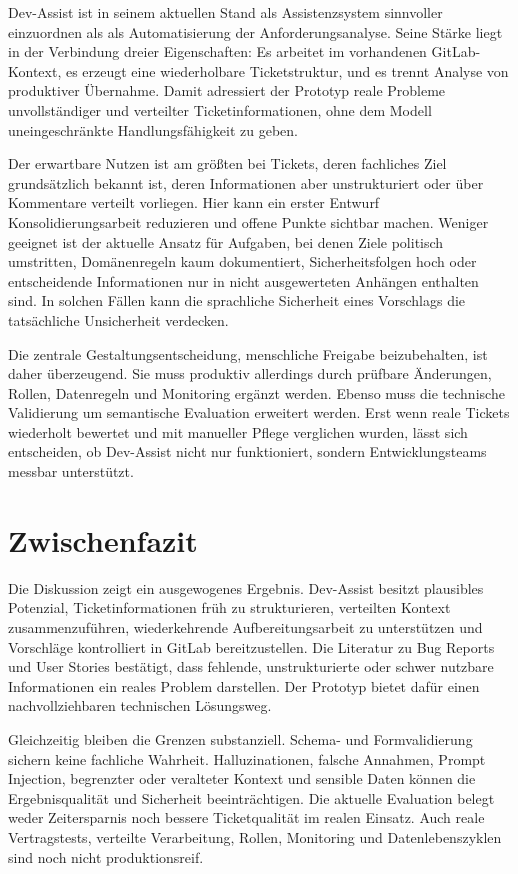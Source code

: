 Dev-Assist ist in seinem aktuellen Stand als Assistenzsystem sinnvoller einzuordnen als als Automatisierung der Anforderungsanalyse. Seine Stärke liegt in der Verbindung dreier Eigenschaften: Es arbeitet im vorhandenen GitLab-Kontext, es erzeugt eine wiederholbare Ticketstruktur, und es trennt Analyse von produktiver Übernahme. Damit adressiert der Prototyp reale Probleme unvollständiger und verteilter Ticketinformationen, ohne dem Modell uneingeschränkte Handlungsfähigkeit zu geben.

Der erwartbare Nutzen ist am größten bei Tickets, deren fachliches Ziel grundsätzlich bekannt ist, deren Informationen aber unstrukturiert oder über Kommentare verteilt vorliegen. Hier kann ein erster Entwurf Konsolidierungsarbeit reduzieren und offene Punkte sichtbar machen. Weniger geeignet ist der aktuelle Ansatz für Aufgaben, bei denen Ziele politisch umstritten, Domänenregeln kaum dokumentiert, Sicherheitsfolgen hoch oder entscheidende Informationen nur in nicht ausgewerteten Anhängen enthalten sind. In solchen Fällen kann die sprachliche Sicherheit eines Vorschlags die tatsächliche Unsicherheit verdecken.

Die zentrale Gestaltungsentscheidung, menschliche Freigabe beizubehalten, ist daher überzeugend. Sie muss produktiv allerdings durch prüfbare Änderungen, Rollen, Datenregeln und Monitoring ergänzt werden. Ebenso muss die technische Validierung um semantische Evaluation erweitert werden. Erst wenn reale Tickets wiederholt bewertet und mit manueller Pflege verglichen wurden, lässt sich entscheiden, ob Dev-Assist nicht nur funktioniert, sondern Entwicklungsteams messbar unterstützt.

\section{Zwischenfazit}

Die Diskussion zeigt ein ausgewogenes Ergebnis. Dev-Assist besitzt plausibles Potenzial, Ticketinformationen früh zu strukturieren, verteilten Kontext zusammenzuführen, wiederkehrende Aufbereitungsarbeit zu unterstützen und Vorschläge kontrolliert in GitLab bereitzustellen. Die Literatur zu Bug Reports und User Stories bestätigt, dass fehlende, unstrukturierte oder schwer nutzbare Informationen ein reales Problem darstellen. Der Prototyp bietet dafür einen nachvollziehbaren technischen Lösungsweg.

Gleichzeitig bleiben die Grenzen substanziell. Schema- und Formvalidierung sichern keine fachliche Wahrheit. Halluzinationen, falsche Annahmen, Prompt Injection, begrenzter oder veralteter Kontext und sensible Daten können die Ergebnisqualität und Sicherheit beeinträchtigen. Die aktuelle Evaluation belegt weder Zeitersparnis noch bessere Ticketqualität im realen Einsatz. Auch reale Vertragstests, verteilte Verarbeitung, Rollen, Monitoring und Datenlebenszyklen sind noch nicht produktionsreif.

